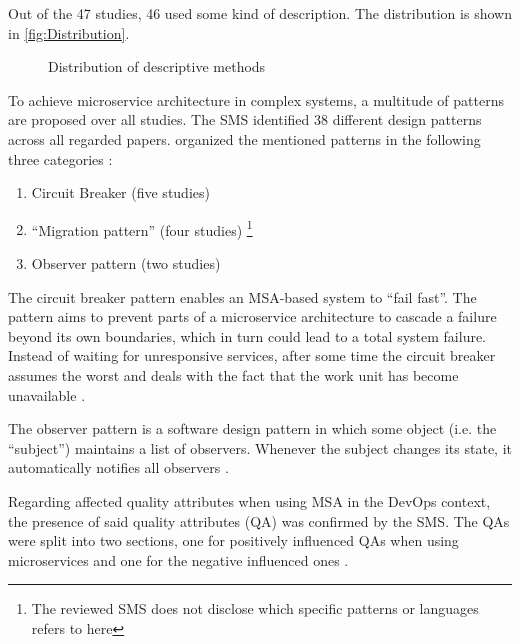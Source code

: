 Out of the 47 studies, 46 used some kind of description.
The distribution is shown in \autoref{fig:Distribution}.

\begin{figure}[ht]
    \caption{Distribution of descriptive methods}
    \label{fig:Distribution}
\end{figure}

To achieve microservice architecture in complex systems, a multitude of
patterns are proposed over all studies. The SMS identified 38 different design
patterns across all regarded papers. \smsAuthors organized the mentioned
patterns in the following three categories \cite{waseem:SMSMSADevOps}:

\begin{enumerate}
    \item Circuit Breaker (five studies)
    \item ``Migration pattern'' (four studies) \cite{waseem:SMSMSADevOps}
          \footnote{The reviewed SMS does not disclose which specific patterns or languages
              refers to here}
    \item Observer pattern (two studies)
\end{enumerate}

The circuit breaker pattern enables an MSA-based system to ``fail fast''.
The pattern aims to prevent parts of a microservice architecture to cascade
a failure beyond its own boundaries, which in turn could lead to a total
system failure. Instead of waiting for unresponsive services, after some time
the circuit breaker assumes the worst and deals with the fact that the
work unit has become unavailable \cite{montesi:CircuitBreakers}.

The observer pattern is a software design pattern in which some object (i.e. the ``subject'')
maintains a list of observers. Whenever the subject changes its state, it automatically
notifies all observers \cite{gof:DesignPatterns}.

Regarding affected quality attributes when using MSA in the DevOps context,
the presence of said quality attributes (QA) was confirmed by the SMS.
The QAs were split into two sections, one for positively influenced QAs when
using microservices and one for the negative influenced ones \cite{waseem:SMSMSADevOps}.

